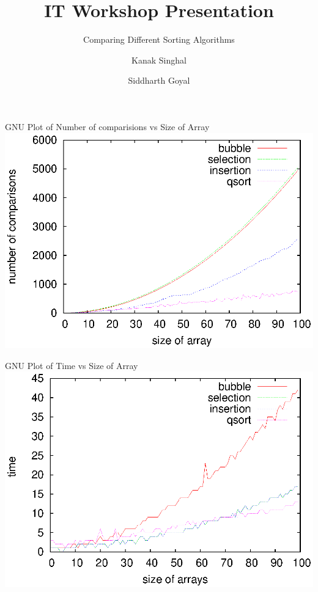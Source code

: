 \documentclass{beamer}
\title{IT Workshop Presentation}
\subtitle{Comparing Different Sorting Algorithms}
\author[Kanak, Siddharth]
{Kanak Singhal\inst{1} \and Siddharth Goyal\inst{2}}
\institute[LNMIIT] 
{
  \inst{1}%
  15UCS057\\
  LNMIIT
  \and
  \inst{2}%
  15UCS140\\
  LNMIIT
}
\begin{document}
\begin{frame}
\titlepage
\end{frame}

\begin{block}{GNU Plot of Number of comparisions vs Size of Array}
\includegraphics[scale=0.75]{noc.eps}
\end{block}

\begin{frame}
\begin{block}{GNU Plot of Time vs Size of Array}
\includegraphics[scale=0.75]{time.eps}
\end{block}
\end{frame}
\end{document}
